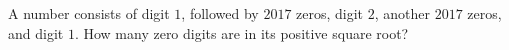 A number consists of digit $1$, followed by $2017$ zeros, digit $2$, another $2017$ zeros, and digit $1$. How many zero digits are in its positive square root?
